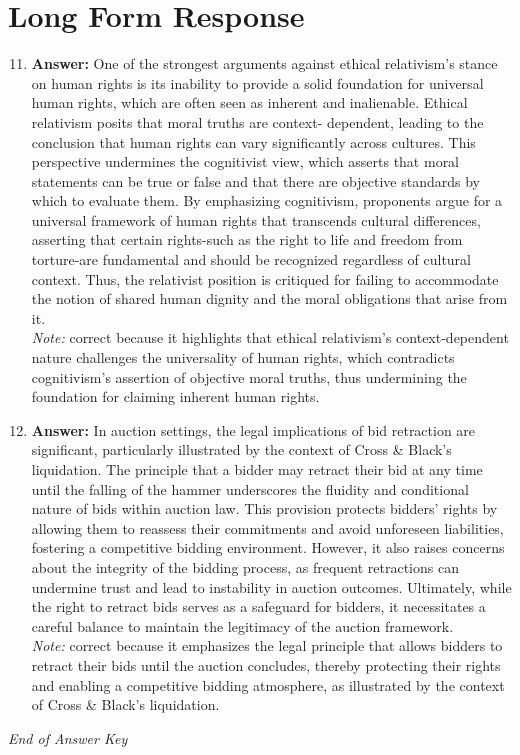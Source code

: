 \documentclass[12pt]{article}
\begin{document}
\section*{Long Form Response}
\begin{enumerate}[label=\arabic*.]
\setcounter{enumi}{10}
\item \textbf{Answer:} One of the strongest arguments against ethical relativism's stance on human rights is its inability to provide a solid foundation for universal human rights, which are often seen as inherent and inalienable. Ethical relativism posits that moral truths are context- dependent, leading to the conclusion that human rights can vary significantly across cultures. This perspective undermines the cognitivist view, which asserts that moral statements can be true or false and that there are objective standards by which to evaluate them. By emphasizing cognitivism, proponents argue for a universal framework of human rights that transcends cultural differences, asserting that certain rights-such as the right to life and freedom from torture-are fundamental and should be recognized regardless of cultural context. Thus, the relativist position is critiqued for failing to accommodate the notion of shared human dignity and the moral obligations that arise from it.
\\ \textit{Note:} correct because it highlights that ethical relativism's context-dependent nature challenges the universality of human rights, which contradicts cognitivism's assertion of objective moral truths, thus undermining the foundation for claiming inherent human rights.
\item \textbf{Answer:} In auction settings, the legal implications of bid retraction are significant, particularly illustrated by the context of Cross \& Black's liquidation. The principle that a bidder may retract their bid at any time until the falling of the hammer underscores the fluidity and conditional nature of bids within auction law. This provision protects bidders' rights by allowing them to reassess their commitments and avoid unforeseen liabilities, fostering a competitive bidding environment. However, it also raises concerns about the integrity of the bidding process, as frequent retractions can undermine trust and lead to instability in auction outcomes. Ultimately, while the right to retract bids serves as a safeguard for bidders, it necessitates a careful balance to maintain the legitimacy of the auction framework.
\\ \textit{Note:} correct because it emphasizes the legal principle that allows bidders to retract their bids until the auction concludes, thereby protecting their rights and enabling a competitive bidding atmosphere, as illustrated by the context of Cross \& Black's liquidation.
\end{enumerate}

\vfill
\noindent\textit{End of Answer Key}
\end{document}
